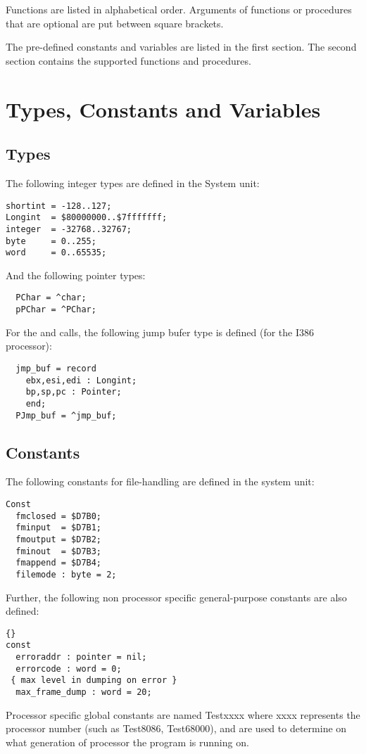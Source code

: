 \documentclass{report}
\begin{document}
Functions are listed in alphabetical order. Arguments of functions or 
procedures that are optional are put between square brackets.

The pre-defined constants and variables are listed in the first section. The
second section contains the supported functions and procedures.

\section{Types, Constants and Variables}
\subsection{Types}
The following integer types are defined in the System unit:
\begin{verbatim}
shortint = -128..127;
Longint  = $80000000..$7fffffff;
integer  = -32768..32767;
byte     = 0..255;
word     = 0..65535;
\end{verbatim}
And the following pointer types:
\begin{verbatim}
  PChar = ^char;
  pPChar = ^PChar;
\end{verbatim}
For the  and  calls, the following jump bufer
type is defined (for the I386 processor):
\begin{verbatim}
  jmp_buf = record
    ebx,esi,edi : Longint;
    bp,sp,pc : Pointer;
    end;
  PJmp_buf = ^jmp_buf;
\end{verbatim}
\subsection{Constants}
The following constants for file-handling are defined in the system unit:
\begin{verbatim}
Const
  fmclosed = $D7B0;
  fminput  = $D7B1;
  fmoutput = $D7B2;
  fminout  = $D7B3;
  fmappend = $D7B4;
  filemode : byte = 2;
\end{verbatim}
Further, the following non processor specific general-purpose constants
are also defined:
\begin{lstlisting}{}
const
  erroraddr : pointer = nil;
  errorcode : word = 0;
 { max level in dumping on error }
  max_frame_dump : word = 20;
\end{lstlisting}{}
\begin{remark}
Processor specific global constants are named Testxxxx where xxxx 
represents the processor number (such as Test8086, Test68000),
and are used to determine on what generation of processor the program
is running on.
\end{remark}
\end{document}
